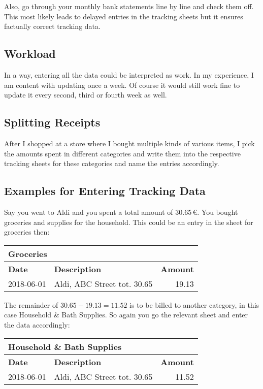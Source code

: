Also, go through your monthly bank statements line by line and check them off.
This most likely leads to delayed entries in the tracking sheets but it ensures factually correct tracking data.

\subsection{Workload}
\label{subsec:tracking-workload}

In a way, entering all the data could be interpreted as work.
In my experience, I am content with updating \tfn once a week.
Of course it would still work fine to update it every second, third or fourth week as well.


\subsection{Splitting Receipts}
\label{subsec:splitting-receipts}

After I shopped at a store where I bought multiple kinds of various items, I pick the amounts spent in different categories and write them into the respective tracking sheets for these categories and name the entries accordingly.

\subsection{Examples for Entering Tracking Data}
\label{subsec:examples-for-entering-tracking-data}

Say you went to Aldi and you spent a total amount of 30.65\,€.
You bought groceries and supplies for the household.
This could be an entry in the sheet for groceries then:
\begin{center}\sffamily
	\begin{tabular}{|l|l|r|}
		\multicolumn{3}{l}{Groceries}\\
		\hline
		\textbf{Date} & \textbf{Description} & \textbf{Amount}\rmfamily\\
		\hline
		2018-06-01 & Aldi, ABC Street tot. 30.65 & 19.13\\
		\hline
	\end{tabular}
\end{center}

The remainder of \( 30.65 - 19.13 = 11.52\) is to be billed to another category, in this case Household \& Bath Supplies.
So again you go the relevant sheet and enter the data accordingly:
\begin{center}\sffamily
	\begin{tabular}{|l|l|r|}
		\multicolumn{3}{l}{Household \& Bath Supplies}\\			
		\hline
		\textbf{Date} & \textbf{Description} & \textbf{Amount}\\
		\hline
		2018-06-01 & Aldi, ABC Street tot. 30.65 & 11.52\\
		\hline
	\end{tabular}
\end{center}


